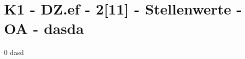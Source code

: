\section{K1 - DZ.ef - 2[11] - Stellenwerte - OA - dasda}

\begin{langesbeispiel}\item[0] %
dasd

\end{langesbeispiel}